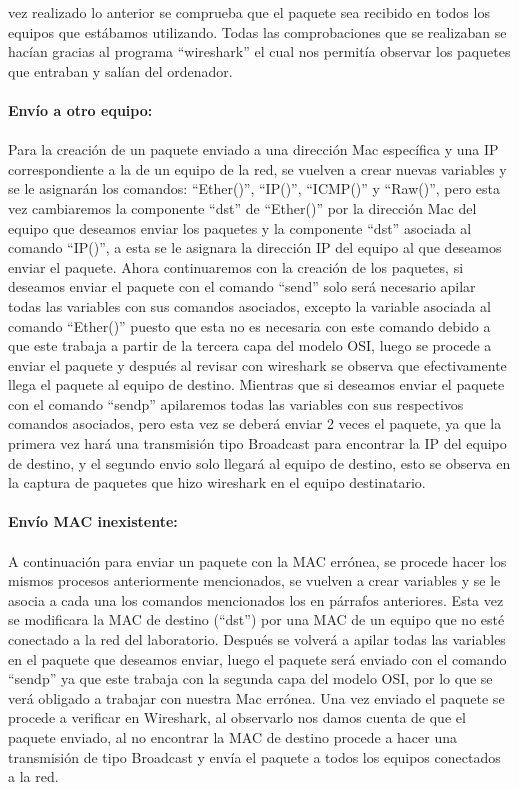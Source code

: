 \documentclass{udpreport}
\begin{document}
		vez realizado lo anterior se comprueba que el paquete sea recibido en todos los equipos que estábamos utilizando.
		Todas las comprobaciones que se realizaban se hacían gracias al programa “wireshark” el cual nos permitía observar los
		paquetes que entraban y salían del ordenador.\\\\
		{\bf \large Envío a otro equipo:}\\\\
		Para la creación de un paquete enviado a una dirección Mac específica y una IP correspondiente a la de un equipo de la
		red, se vuelven a crear nuevas variables y se le asignarán los comandos: “Ether()”, “IP()”, “ICMP()” y “Raw()”, pero
		esta vez cambiaremos la componente “dst” de “Ether()” por la dirección Mac del equipo que deseamos enviar los paquetes
		y la componente “dst” asociada al comando “IP()”, a esta se le asignara la dirección IP del equipo al que deseamos
		enviar el paquete. Ahora continuaremos con la creación de los paquetes, si deseamos enviar el paquete con el comando
		“send” solo será necesario apilar todas las variables con sus comandos asociados, excepto la variable asociada al
		comando “Ether()” puesto que esta no es necesaria con este comando debido a que este trabaja a partir de la tercera
		capa del modelo OSI, luego se procede a enviar el paquete y  después al revisar con wireshark se observa que
		efectivamente llega el paquete al equipo de destino. Mientras que si deseamos enviar el paquete con el comando “sendp”
		apilaremos todas las variables con sus respectivos comandos asociados,  pero esta vez se deberá enviar 2 veces el
		paquete, ya que la primera vez hará una transmisión tipo Broadcast para encontrar la IP del equipo de destino, y el
		segundo envio solo llegará al equipo de destino, esto se observa en la captura de paquetes que hizo wireshark en el
		equipo destinatario.\\\\
		{\bf \large Envío MAC inexistente:}\\\\
		A continuación para enviar un paquete con la MAC errónea, se procede hacer los mismos procesos anteriormente
		mencionados, se vuelven a crear variables y se le asocia a cada una los comandos mencionados los en párrafos
		anteriores. Esta vez se modificara la MAC de destino (“dst”)  por una MAC de un equipo que no esté conectado a la red
		del laboratorio. Después se volverá a apilar todas las variables en el paquete que deseamos enviar, luego el paquete
		será enviado con el comando “sendp” ya que este trabaja con la segunda capa del modelo OSI, por lo que se verá
		obligado a trabajar con nuestra Mac errónea. Una vez enviado el paquete se procede a verificar en Wireshark, al
		observarlo nos damos cuenta de que el paquete enviado, al no encontrar la MAC de destino procede a hacer una
		transmisión de tipo Broadcast y envía el paquete a todos los equipos conectados a la red.\\
\end{document}
